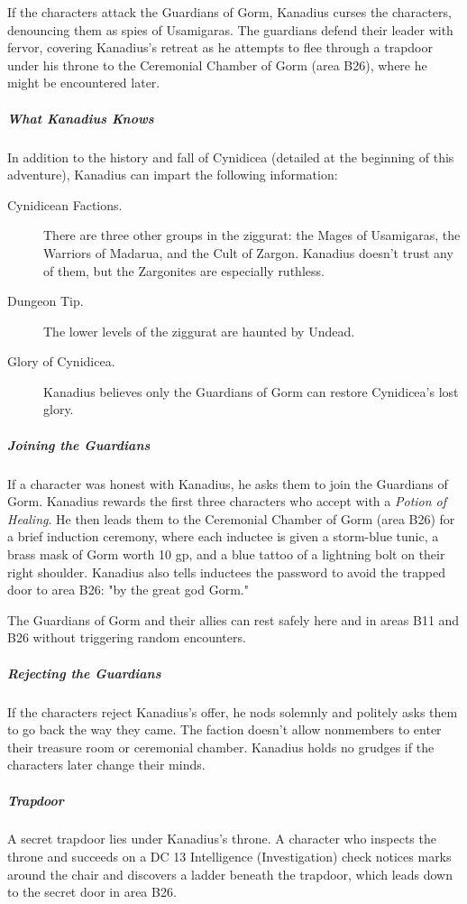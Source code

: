 \documentclass[10pt,a4paper,twoside,bg=print,twocolumn,openany,nodeprecatedcode]{dndbook}
\begin{document}
If the characters attack the Guardians of Gorm, Kanadius curses the characters, denouncing them as spies of Usamigaras. The guardians defend their leader with fervor, covering Kanadius's retreat as he attempts to flee through a trapdoor under his throne to the Ceremonial Chamber of Gorm (area B26), where he might be encountered later.

\subparagraph{What Kanadius Knows}
In addition to the history and fall of Cynidicea (detailed at the beginning of this adventure), Kanadius can impart the following information:


\begin{description}
\item[Cynidicean Factions.]
There are three other groups in the ziggurat: the Mages of Usamigaras, the Warriors of Madarua, and the Cult of Zargon. Kanadius doesn't trust any of them, but the Zargonites are especially ruthless.
\item[Dungeon Tip.]
The lower levels of the ziggurat are haunted by Undead.
\item[Glory of Cynidicea.]
Kanadius believes only the Guardians of Gorm can restore Cynidicea's lost glory.
\end{description}

\subparagraph{Joining the Guardians}
If a character was honest with Kanadius, he asks them to join the Guardians of Gorm. Kanadius rewards the first three characters who accept with a \textit{Potion of Healing}. He then leads them to the Ceremonial Chamber of Gorm (area B26) for a brief induction ceremony, where each inductee is given a storm-blue tunic, a brass mask of Gorm worth 10 gp, and a blue tattoo of a lightning bolt on their right shoulder. Kanadius also tells inductees the password to avoid the trapped door to area B26: "by the great god Gorm."

The Guardians of Gorm and their allies can rest safely here and in areas B11 and B26 without triggering random encounters.

\subparagraph{Rejecting the Guardians}
If the characters reject Kanadius's offer, he nods solemnly and politely asks them to go back the way they came. The faction doesn't allow nonmembers to enter their treasure room or ceremonial chamber. Kanadius holds no grudges if the characters later change their minds.

\subparagraph{Trapdoor}
A secret trapdoor lies under Kanadius's throne. A character who inspects the throne and succeeds on a DC 13 Intelligence (Investigation) check notices marks around the chair and discovers a ladder beneath the trapdoor, which leads down to the secret door in area B26.
\end{document}

